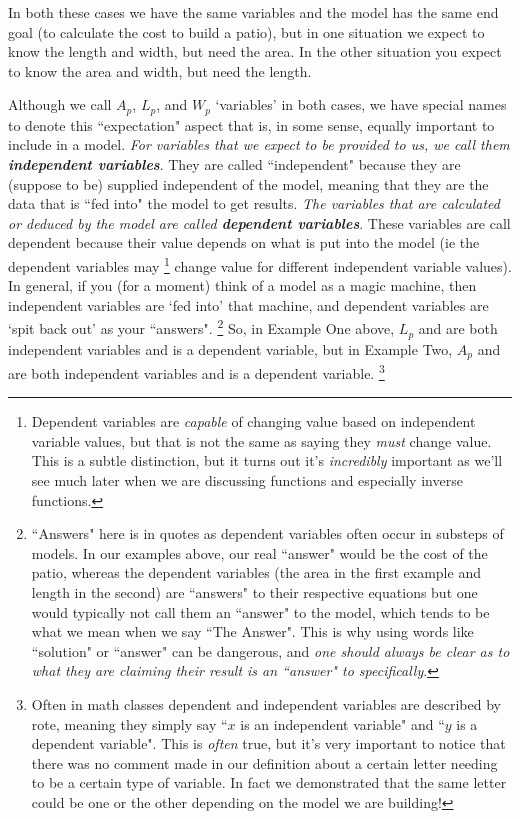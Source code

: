 \documentclass{ximeraXloud}
\begin{document}
    In both these cases we have the same variables and the model has the same end goal (to calculate the cost to build a patio), but in one situation we expect to know the length and width, but need the area. In the other situation you expect to know the area and width, but need the length.
    
    \begin{exploration}
        Although we call $A_p$, $L_p$, and $W_p$ `variables' in both cases, we have special names to denote this ``expectation" aspect that is, in some sense, equally important to include in a model. \textit{For variables that we expect to be provided to us, we call them \textbf{independent variables}}. They are called ``independent" because they are (suppose to be) supplied independent of the model, meaning that they are the data that is ``fed into" the model to get results. \textit{The variables that are calculated or deduced by the model are called \textbf{dependent variables}}. These variables are call dependent because their value depends on what is put into the model (ie the dependent variables may%
        \footnote{Dependent variables are \textit{capable} of changing value based on independent variable values, but that is not the same as saying they \textit{must} change value. This is a subtle distinction, but it turns out it's \textit{incredibly} important as we'll see much later when we are discussing functions and especially inverse functions.}
        change value for different independent variable values). In general, if you (for a moment) think of a model as a magic machine, then independent variables are `fed into' that machine, and dependent variables are `spit back out' as your ``answers".%
        \footnote{``Answers" here is in quotes as dependent variables often occur in substeps of models. In our examples above, our real ``answer" would be the cost of the patio, whereas the dependent variables (the area in the first example and length in the second) are ``answers" to their respective equations but one would typically not call them an ``answer" to the model, which tends to be what we mean when we say ``The Answer". This is why using words like ``solution" or ``answer" can be dangerous, and \textit{one should always be clear as to what they are claiming their result is an ``answer" to specifically}.}
        So, in Example One above, $L_p$ and  are both independent variables and  is a dependent variable, but in Example Two, $A_p$ and are both independent variables and  is a dependent variable.%
        \footnote{Often in math classes dependent and independent variables are described by rote, meaning they simply say ``$x$ is an independent variable" and ``$y$ is a dependent variable". This is \textit{often} true, but it's very important to notice that there was no comment made in our definition about a certain letter needing to be a certain type of variable. In fact we demonstrated that the same letter could be one or the other depending on the model we are building!}
    \end{exploration}
    
\end{document}
